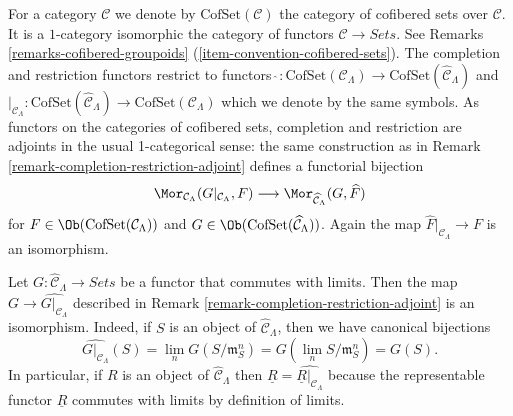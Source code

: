 \begin{remark}
\label{remark-completion-restriction-cofset-adjoint}
For a category $\mathcal{C}$ we denote by $\text{CofSet}(\mathcal{C})$ the
category of cofibered sets over $\mathcal{C}$. It is a $1$-category
isomorphic the category of functors $\mathcal{C} \to \textit{Sets}$.
See Remarks \ref{remarks-cofibered-groupoids}
(\ref{item-convention-cofibered-sets}).
The completion and restriction functors restrict to functors
$\widehat{~} : \text{CofSet}(\mathcal{C}_\Lambda) \to
\text{CofSet}(\widehat{\mathcal{C}}_\Lambda)$ and
$|_{\mathcal{C}_\Lambda} : \text{CofSet}(\widehat{\mathcal{C}}_\Lambda) \to
\text{CofSet}(\mathcal{C}_\Lambda)$ which we denote by the same symbols.
As functors on the categories of cofibered sets, completion and restriction
are adjoints in the usual 1-categorical sense: the same construction as in
Remark \ref{remark-completion-restriction-adjoint} defines a functorial
bijection
$$
\Mor_{\mathcal{C}_\Lambda}(G|_{\mathcal{C}_\Lambda}, F)
\longrightarrow
\Mor_{\widehat{\mathcal{C}}_\Lambda}(G, \widehat{F})
$$
for $F \in \Ob(\text{CofSet}(\mathcal{C}_\Lambda))$ and
$G \in \Ob(\text{CofSet}(\widehat{\mathcal{C}}_\Lambda))$.
Again the map $\widehat{F}|_{\mathcal{C}_\Lambda} \to F$ is an
isomorphism.
\end{remark}

\begin{remark}
\label{remark-restrict-complete-continuous-functor}
Let $G : \widehat{\mathcal{C}}_\Lambda \to \textit{Sets}$
be a functor that commutes with limits.
Then the map $G \to \widehat{G|_{\mathcal{C}_\Lambda}}$ described in
Remark \ref{remark-completion-restriction-adjoint}
is an isomorphism. Indeed, if $S$ is  an object of
$\widehat{\mathcal{C}}_\Lambda$, then we have canonical bijections
$$
\widehat{G|_{\mathcal{C}_\Lambda}}(S) =
\lim_n G(S/\mathfrak{m}_S^n) =
G(\lim_n S/\mathfrak{m}_S^n) = G(S).
$$
In particular, if $R$ is an object of $\widehat{\mathcal{C}}_\Lambda$ then
$\underline{R} = \widehat{\underline{R}|_{\mathcal{C}_\Lambda}}$ because
the representable functor $\underline{R}$ commutes with limits by definition
of limits.
\end{remark}

